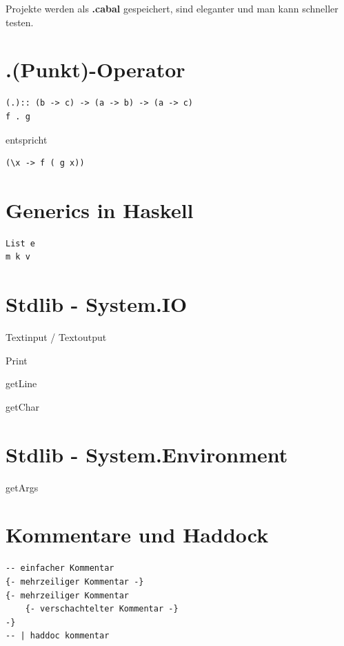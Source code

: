 \documentclass[ngerman,a4paper]{report}
\begin{document}
Projekte werden als \textbf{.cabal} gespeichert, sind eleganter und man kann schneller testen.

\section{.(Punkt)-Operator}
\begin{lstlisting}
(.):: (b -> c) -> (a -> b) -> (a -> c)
f . g
\end{lstlisting}

entspricht\\

\begin{lstlisting}
(\x -> f ( g x))
\end{lstlisting}

\section{Generics in Haskell}

\begin{lstlisting}
List e
m k v
\end{lstlisting}

\section{Stdlib - System.IO}
\begin{compactitem}
\item Textinput / Textoutput
\begin{compactitem}
\item Print
\item getLine
\item getChar
\end{compactitem}
\end{compactitem}

\section{Stdlib - System.Environment}
\begin{compactitem}
\item getArgs
\end{compactitem}

\section{Kommentare und Haddock}
\begin{lstlisting}
-- einfacher Kommentar
{- mehrzeiliger Kommentar -}
{- mehrzeiliger Kommentar 
	{- verschachtelter Kommentar -} 
-}
-- | haddoc kommentar
\end{lstlisting}
\end{document}
